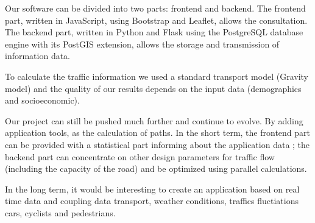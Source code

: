 Our software can be divided into two parts: frontend and backend. The frontend part, written in JavaScript, using Bootstrap and Leaflet, allows the consultation. The backend part, written in Python and Flask using the PostgreSQL database engine with its PostGIS extension, allows the storage and transmission of information data.

To calculate the traffic information we used a standard transport model (Gravity model) and the quality of our results depends on the input data (demographics and socioeconomic).

Our project can still be pushed much further and continue to evolve. By adding application tools, as the calculation of paths. In the short term, the frontend part can be provided with a statistical part informing about the application data ; the backend part can concentrate on other design parameters for traffic flow (including the capacity of the road) and be optimized using parallel calculations.

In the long term, it would be interesting to create an application based on real time data and coupling data transport, weather conditions, traffics fluctiations cars, cyclists and pedestrians.






